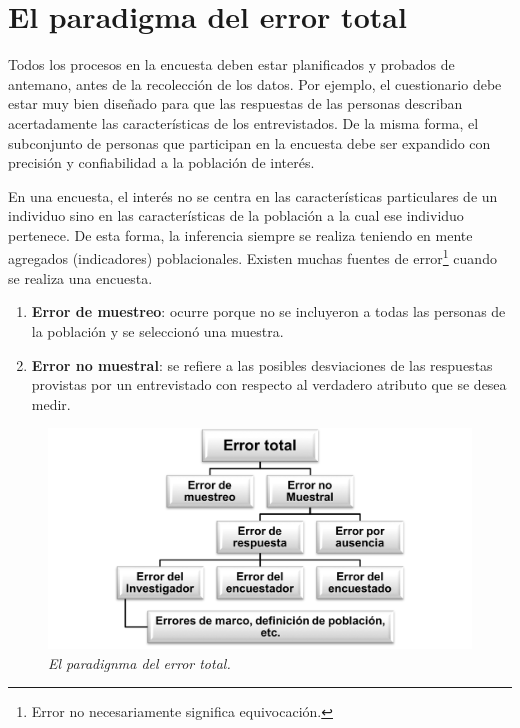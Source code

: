 \documentclass[
  10pt,
  spanish,
]{book}
\providecommand{\tightlist}{%
  \setlength{\itemsep}{0pt}\setlength{\parskip}{0pt}}
\begin{document}
\hypertarget{el-paradigma-del-error-total}{%
\chapter{El paradigma del error total}\label{el-paradigma-del-error-total}}

Todos los procesos en la encuesta deben estar planificados y probados de antemano, antes de la recolección de los datos. Por ejemplo, el cuestionario debe estar muy bien diseñado para que las respuestas de las personas describan acertadamente las características de los entrevistados. De la misma forma, el subconjunto de personas que participan en la encuesta debe ser expandido con precisión y confiabilidad a la población de interés.

En una encuesta, el interés no se centra en las características particulares de un individuo sino en las características de la población a la cual ese individuo pertenece. De esta forma, la inferencia siempre se realiza teniendo en mente agregados (indicadores) poblacionales. Existen muchas fuentes de error\footnote{Error no necesariamente significa equivocación.} cuando se realiza una encuesta.

\begin{enumerate}
\def\labelenumi{\arabic{enumi}.}
\tightlist
\item
  \textbf{Error de muestreo}: ocurre porque no se incluyeron a todas las personas de la población y se seleccionó una muestra.
\item
  \textbf{Error no muestral}: se refiere a las posibles desviaciones de las respuestas provistas por un entrevistado con respecto al verdadero atributo que se desea medir.
\end{enumerate}

\begin{figure}
\centering
\includegraphics{Pics/Picture9.png}
\caption{\emph{El paradignma del error total.}}
\end{figure}
\end{document}
